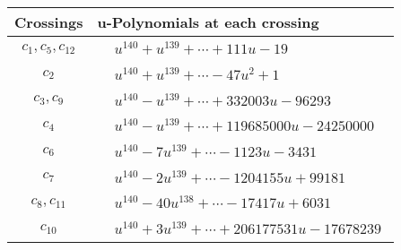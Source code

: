 \documentclass[1p]{elsarticle_modified}
\theoremstyle{definition}
\begin{document}
\begin{tabular}{m{50pt}|m{274pt}}
Crossings & \hspace{64pt}u-Polynomials at each crossing \\
\hline $$\begin{aligned}c_{1},c_{5},c_{12}\end{aligned}$$&$\begin{aligned}
&u^{140}+u^{139}+\cdots+111 u-19
\end{aligned}$\\
\hline $$\begin{aligned}c_{2}\end{aligned}$$&$\begin{aligned}
&u^{140}+u^{139}+\cdots-47 u^2+1
\end{aligned}$\\
\hline $$\begin{aligned}c_{3},c_{9}\end{aligned}$$&$\begin{aligned}
&u^{140}- u^{139}+\cdots+332003 u-96293
\end{aligned}$\\
\hline $$\begin{aligned}c_{4}\end{aligned}$$&$\begin{aligned}
&u^{140}- u^{139}+\cdots+119685000 u-24250000
\end{aligned}$\\
\hline $$\begin{aligned}c_{6}\end{aligned}$$&$\begin{aligned}
&u^{140}-7 u^{139}+\cdots-1123 u-3431
\end{aligned}$\\
\hline $$\begin{aligned}c_{7}\end{aligned}$$&$\begin{aligned}
&u^{140}-2 u^{139}+\cdots-1204155 u+99181
\end{aligned}$\\
\hline $$\begin{aligned}c_{8},c_{11}\end{aligned}$$&$\begin{aligned}
&u^{140}-40 u^{138}+\cdots-17417 u+6031
\end{aligned}$\\
\hline $$\begin{aligned}c_{10}\end{aligned}$$&$\begin{aligned}
&u^{140}+3 u^{139}+\cdots+206177531 u-17678239
\end{aligned}$\\
\hline
\end{tabular}\\~\\
\end{document}
